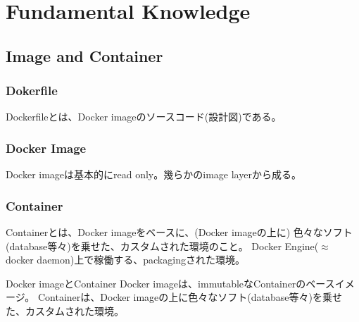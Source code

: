\documentclass[10pt,a4j,openany,dvipdfmx]{jsarticle}
\begin{document}
\section{Fundamental Knowledge} %
\label{sec:fundamental_knowledge}

\subsection{Image and Container} %
\label{sub:image_and_container}

\subsubsection{Dokerfile} %
\label{ssub:dokerfile}


\begin{tcolorbox}[
title=Dockerfile, fonttitle=\bfseries]
Dockerfileとは、Docker imageのソースコード(設計図)である。
\end{tcolorbox}


\subsubsection{Docker Image} %
\label{ssub:docker_image}


\begin{tcolorbox}[
title=Docker Image, fonttitle=\bfseries]
Docker imageは基本的にread only。幾らかのimage layerから成る。
\end{tcolorbox}


\subsubsection{Container} %
\label{ssub:container}


\begin{tcolorbox}[
title=Container, fonttitle=\bfseries]
Containerとは、Docker imageをベースに、(Docker imageの上に) 色々なソフト(database等々)を乗せた、カスタムされた環境のこと。
Docker Engine($\approx$ docker daemon)上で稼働する、packagingされた環境。
\end{tcolorbox}

\begin{skybox}{Docker imageとContainer}
Docker imageは、immutableなContainerのベースイメージ。
Containerは、Docker imageの上に色々なソフト(database等々)を乗せた、カスタムされた環境。
\end{skybox}
\end{document}
